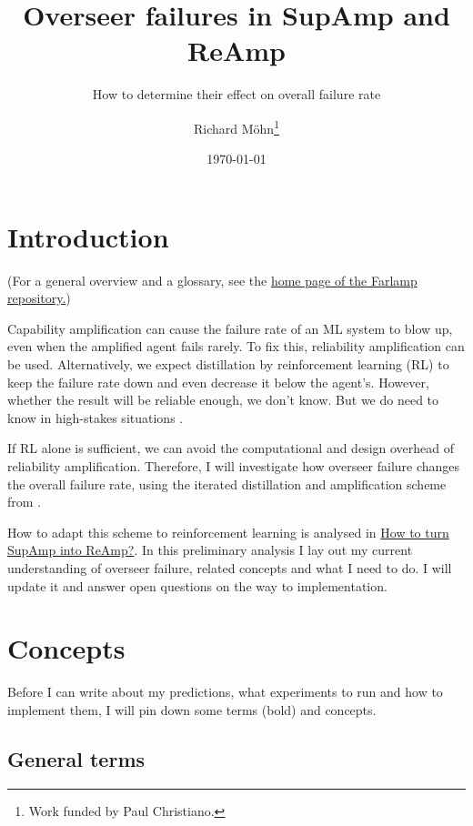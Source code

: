 \documentclass{farlamp}
\title{Overseer failures in SupAmp and ReAmp}
\subtitle{How to determine their effect on overall failure rate}
\author{Richard Möhn\thanks{Work funded by Paul Christiano.}}
\date{\today}
\begin{document}
\maketitle
\tableofcontents

\section{Introduction}

(For a general overview and a glossary, see the
\href{https://github.com/rmoehn/farlamp}{home page of the Farlamp
repository.})

Capability amplification can cause the failure rate of an ML system to blow up,
even when the amplified agent fails rarely. To fix this, reliability
amplification can be used. Alternatively, we expect distillation by
reinforcement learning (RL) to keep the failure rate down and even decrease it
below the agent's. However, whether the result will be reliable enough, we don't
know.\parencite{ChriRelAmp} But we do need to know in high-stakes situations
\parencite[see][]{ChriLearnCata}.

If RL alone is sufficient, we can avoid the computational and design overhead of
reliability amplification. Therefore, I will investigate how overseer failure
changes the overall failure rate, using the iterated distillation and
amplification scheme from \textcite{CSASupAmp}.

How to adapt this scheme to reinforcement learning is analysed in
\href{https://github.com/rmoehn/farlamp/raw/master/supamp-reamp.pdf}{How to turn
SupAmp into ReAmp?}. In this preliminary analysis I lay out my current
understanding of overseer failure, related concepts and what I need to do. I
will update it and answer open questions on the way to implementation.


\section{Concepts}

Before I can write about my predictions, what experiments to run and how to
implement them, I will pin down some terms (bold) and concepts.



\subsection{General terms}
\end{document}
